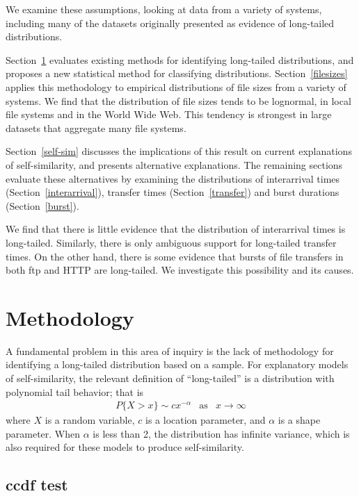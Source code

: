 \documentclass{elsart}
\begin{document}
We examine these assumptions, looking at data from a variety
of systems, including many of the datasets originally presented as
evidence of long-tailed distributions.

Section~\ref{methodology} evaluates existing methods for identifying
long-tailed distributions, and proposes a new statistical method
for classifying distributions.
Section~\ref{filesizes} applies this methodology to empirical
distributions of file sizes from a variety of systems.
We find that the distribution of file sizes tends to be lognormal,
in local file systems and in the World Wide Web.  This tendency is
strongest in large datasets that aggregate many file systems.

Section~\ref{self-sim} discusses the implications of this result on current
explanations of self-similarity, and presents alternative explanations.
The remaining
sections evaluate these alternatives by examining the distributions of
interarrival times (Section~\ref{interarrival}),
transfer times (Section~\ref{transfer}) and
burst durations (Section~\ref{burst}).

We find that there is little evidence that
the distribution of interarrival times is long-tailed.  Similarly,
there is only ambiguous support for long-tailed transfer times.
On the other hand, there is some evidence that bursts of file
transfers in both ftp and HTTP are long-tailed.  We investigate this
possibility and its causes.


\section{Methodology}
\label{methodology}

A fundamental problem in this area of inquiry is the lack of
methodology for identifying a long-tailed distribution based on a
sample.  For explanatory models of self-similarity, the relevant
definition of ``long-tailed'' is a distribution with polynomial tail
behavior; that is
%
\begin{eqnarray}
P\{X > x\} \sim c x^{-\alpha} & \mbox{as} & x \rightarrow \infty
\end{eqnarray}
%
where $X$ is a random variable, $c$ is a location parameter, and
$\alpha$ is a shape parameter.  When $\alpha$ is less than 2, the
distribution has infinite variance, which is
also required for these models to produce self-similarity.

\subsection {ccdf test}
\end{document}
